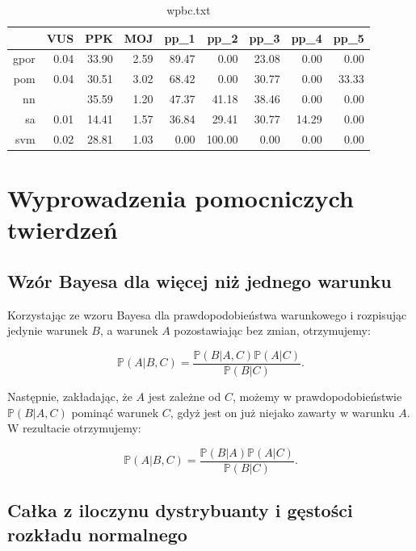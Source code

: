 \documentclass{mini}
\begin{document}
\begin{table}[ht]
\centering
\begin{tabular}{rrrrrrrrr}
\hline
& VUS & PPK & MOJ & pp\_1 & pp\_2 & pp\_3 & pp\_4 & pp\_5 \\
\hline
gpor & 0.04 & 33.90 & 2.59 & 89.47 & 0.00 & 23.08 & 0.00 & 0.00 \\
\rowcolor[gray]{0.95}pom & 0.04 & 30.51 & 3.02 & 68.42 & 0.00 & 30.77 & 0.00 & 33.33 \\
nn & & 35.59 & 1.20 & 47.37 & 41.18 & 38.46 & 0.00 & 0.00 \\
sa & 0.01 & 14.41 & 1.57 & 36.84 & 29.41 & 30.77 & 14.29 & 0.00 \\
\rowcolor[gray]{0.7}svm & 0.02 & 28.81 & 1.03 & 0.00 & 100.00 & 0.00 & 0.00 & 0.00 \\
\hline
\end{tabular}
\caption{wpbc.txt}
\end{table}


\appendix

\chapter{Wyprowadzenia pomocniczych twierdzeń}

\section{Wzór Bayesa dla więcej niż jednego warunku}\label{app1}

Korzystając ze wzoru Bayesa dla prawdopodobieństwa warunkowego i rozpisując jedynie warunek $B$, a warunek $A$ pozostawiając bez zmian, otrzymujemy:

$$
\mathbb{P}(A | B, C) 
=
\frac{
\mathbb{P}(B | A, C)
\mathbb{P}(A | C)
}{
\mathbb{P}(B | C)
}. 
$$

Następnie, zakładając, że $A$ jest zależne od $C$, możemy w prawdopodobieństwie $\mathbb{P}(B | A, C)$ pominąć warunek $C$, gdyż jest on już niejako zawarty w warunku $A$. W rezultacie otrzymujemy:

$$
\mathbb{P}(A | B, C) 
=
\frac{
\mathbb{P}(B | A)
\mathbb{P}(A | C)
}{
\mathbb{P}(B | C)
}. 
$$

\section{Całka z iloczynu dystrybuanty i gęstości rozkładu normalnego}\label{app2}
\end{document}
